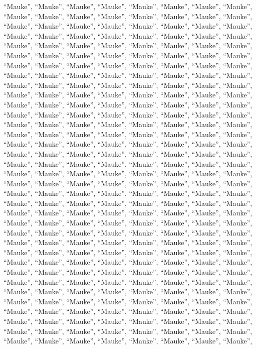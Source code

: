 \documentclass[
  ,man]{apa6}
\begin{document}
``Mauke'', ``Mauke'', ``Mauke'', ``Mauke'', ``Mauke'', ``Mauke'', ``Mauke'', ``Mauke'', ``Mauke'', ``Mauke'', ``Mauke'', ``Mauke'', ``Mauke'', ``Mauke'', ``Mauke'', ``Mauke'', ``Mauke'', ``Mauke'', ``Mauke'', ``Mauke'', ``Mauke'', ``Mauke'', ``Mauke'', ``Mauke'', ``Mauke'', ``Mauke'', ``Mauke'', ``Mauke'', ``Mauke'', ``Mauke'', ``Mauke'', ``Mauke'', ``Mauke'', ``Mauke'', ``Mauke'', ``Mauke'', ``Mauke'', ``Mauke'', ``Mauke'', ``Mauke'', ``Mauke'', ``Mauke'', ``Mauke'', ``Mauke'', ``Mauke'', ``Mauke'', ``Mauke'', ``Mauke'', ``Mauke'', ``Mauke'', ``Mauke'', ``Mauke'', ``Mauke'', ``Mauke'', ``Mauke'', ``Mauke'',
``Mauke'', ``Mauke'', ``Mauke'', ``Mauke'', ``Mauke'', ``Mauke'', ``Mauke'', ``Mauke'', ``Mauke'', ``Mauke'', ``Mauke'', ``Mauke'', ``Mauke'', ``Mauke'', ``Mauke'', ``Mauke'', ``Mauke'', ``Mauke'', ``Mauke'', ``Mauke'', ``Mauke'', ``Mauke'', ``Mauke'', ``Mauke'', ``Mauke'', ``Mauke'', ``Mauke'', ``Mauke'', ``Mauke'', ``Mauke'', ``Mauke'', ``Mauke'', ``Mauke'', ``Mauke'', ``Mauke'', ``Mauke'', ``Mauke'', ``Mauke'', ``Mauke'', ``Mauke'', ``Mauke'', ``Mauke'', ``Mauke'', ``Mauke'', ``Mauke'', ``Mauke'', ``Mauke'', ``Mauke'', ``Mauke'', ``Mauke'', ``Mauke'', ``Mauke'', ``Mauke'', ``Mauke'', ``Mauke'', ``Mauke'',
``Mauke'', ``Mauke'', ``Mauke'', ``Mauke'', ``Mauke'', ``Mauke'', ``Mauke'', ``Mauke'', ``Mauke'', ``Mauke'', ``Mauke'', ``Mauke'', ``Mauke'', ``Mauke'', ``Mauke'', ``Mauke'', ``Mauke'', ``Mauke'', ``Mauke'', ``Mauke'', ``Mauke'', ``Mauke'', ``Mauke'', ``Mauke'', ``Mauke'', ``Mauke'', ``Mauke'', ``Mauke'', ``Mauke'', ``Mauke'', ``Mauke'', ``Mauke'', ``Mauke'', ``Mauke'', ``Mauke'', ``Mauke'', ``Mauke'', ``Mauke'', ``Mauke'', ``Mauke'', ``Mauke'', ``Mauke'', ``Mauke'', ``Mauke'', ``Mauke'', ``Mauke'', ``Mauke'', ``Mauke'', ``Mauke'', ``Mauke'', ``Mauke'', ``Mauke'', ``Mauke'', ``Mauke'', ``Mauke'', ``Mauke'',
``Mauke'', ``Mauke'', ``Mauke'', ``Mauke'', ``Mauke'', ``Mauke'', ``Mauke'', ``Mauke'', ``Mauke'', ``Mauke'', ``Mauke'', ``Mauke'', ``Mauke'', ``Mauke'', ``Mauke'', ``Mauke'', ``Mauke'', ``Mauke'', ``Mauke'', ``Mauke'', ``Mauke'', ``Mauke'', ``Mauke'', ``Mauke'', ``Mauke'', ``Mauke'', ``Mauke'', ``Mauke'', ``Mauke'', ``Mauke'', ``Mauke'', ``Mauke'', ``Mauke'', ``Mauke'', ``Mauke'', ``Mauke'', ``Mauke'', ``Mauke'', ``Mauke'', ``Mauke'', ``Mauke'', ``Mauke'', ``Mauke'', ``Mauke'', ``Mauke'', ``Mauke'', ``Mauke'', ``Mauke'', ``Mauke'', ``Mauke'', ``Mauke'', ``Mauke'', ``Mauke'', ``Mauke'', ``Mauke'', ``Mauke'',
``Mauke'', ``Mauke'', ``Mauke'', ``Mauke'', ``Mauke'', ``Mauke'', ``Mauke'', ``Mauke'', ``Mauke'', ``Mauke'', ``Mauke'', ``Mauke'', ``Mauke'', ``Mauke'', ``Mauke'', ``Mauke'', ``Mauke'', ``Mauke'', ``Mauke'', ``Mauke'', ``Mauke'', ``Mauke'', ``Mauke'', ``Mauke'', ``Mauke'', ``Mauke'', ``Mauke'', ``Mauke'', ``Mauke'', ``Mauke'', ``Mauke'', ``Mauke'', ``Mauke'', ``Mauke'', ``Mauke'', ``Mauke'', ``Mauke'', ``Mauke'', ``Mauke'', ``Mauke'', ``Mauke'', ``Mauke'', ``Mauke'', ``Mauke'', ``Mauke'', ``Mauke'', ``Mauke'', ``Mauke'', ``Mauke'', ``Mauke'', ``Mauke'', ``Mauke'', ``Mauke'', ``Mauke'', ``Mauke'', ``Mauke'',
\end{document}
